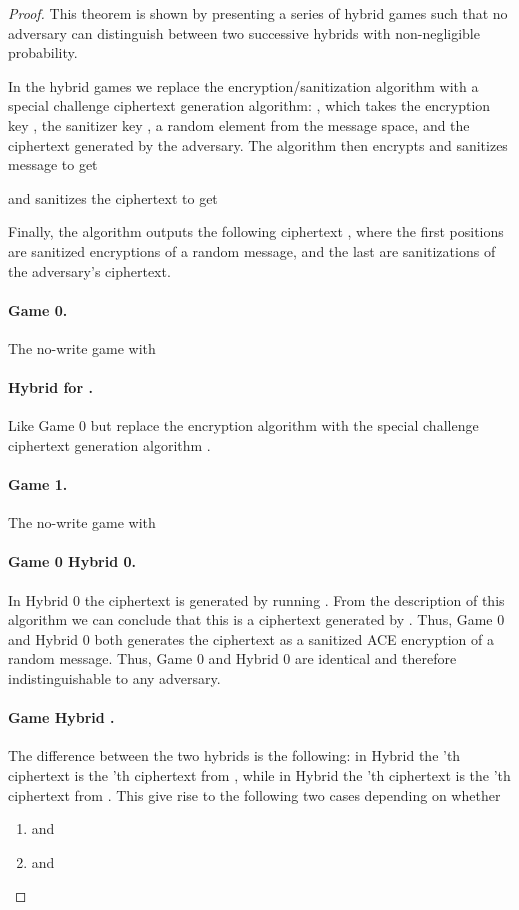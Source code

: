 \documentclass{llncs}
\begin{document}
\begin{proof}
This theorem is shown by presenting a series of hybrid games such that no adversary can distinguish between two successive hybrids with non-negligible probability.

In the hybrid games we  replace the encryption/sanitization algorithm with a special challenge ciphertext generation algorithm: , which takes the encryption key , the sanitizer key , a random element  from the message space, and the ciphertext  generated by the adversary. The algorithm then encrypts and sanitizes message  to get 
 
and sanitizes the ciphertext  to get 
 
Finally, the algorithm outputs the following ciphertext , where the first  positions are sanitized encryptions of a random message, and the last  are sanitizations of the adversary's ciphertext.

\paragraph{Game 0.} The no-write game with 
\paragraph{Hybrid  for .} Like Game 0 but replace the encryption algorithm with the special challenge ciphertext generation algorithm .
\paragraph{Game 1.} The no-write game with 

\paragraph{Game 0  Hybrid 0.} 
In Hybrid 0 the ciphertext  is generated by running . From the description of this algorithm we can conclude that this is a ciphertext generated by . Thus, Game 0 and Hybrid 0 both generates the ciphertext  as a sanitized ACE encryption of a random message. Thus, Game 0 and Hybrid 0 are identical and therefore indistinguishable to any adversary.


\paragraph{Game   Hybrid .} The difference between the two hybrids is the following: in Hybrid  the 'th \oACE ciphertext is the 'th ciphertext from , while in Hybrid  the 'th \oACE ciphertext is the 'th ciphertext from . 
This give rise to the following two cases depending on whether 
\begin{enumerate}
\item  \newline and 
\item  and 
\end{enumerate}


\end{proof}
\end{document}
